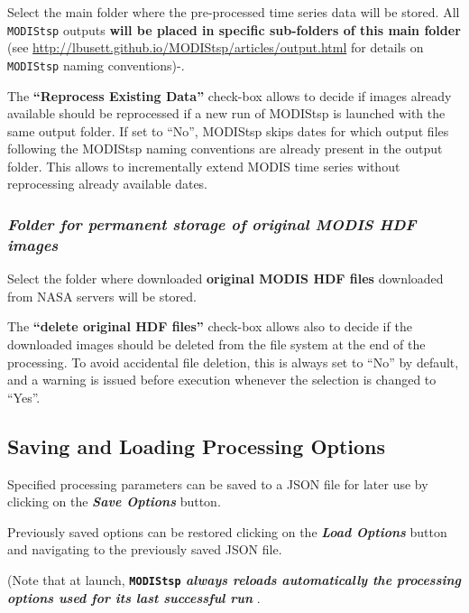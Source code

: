 \documentclass[]{article}
\begin{document}
Select the main folder where the pre-processed time series data will be
stored. All \texttt{MODIStsp} outputs \textbf{will be placed in specific
sub-folders of this main folder} (see
\url{http://lbusett.github.io/MODIStsp/articles/output.html} for details
on \texttt{MODIStsp} naming conventions)-.

The \textbf{``Reprocess Existing Data''} check-box allows to decide if
images already available should be reprocessed if a new run of MODIStsp
is launched with the same output folder. If set to ``No'', MODIStsp
skips dates for which output files following the MODIStsp naming
conventions are already present in the output folder. This allows to
incrementally extend MODIS time series without reprocessing already
available dates.

\subsubsection{\texorpdfstring{\emph{Folder for permanent storage of
original MODIS HDF
images}}{Folder for permanent storage of original MODIS HDF images}}\label{folder-for-permanent-storage-of-original-modis-hdf-images}

Select the folder where downloaded \textbf{original MODIS HDF files}
downloaded from NASA servers will be stored.

The \textbf{``delete original HDF files''} check-box allows also to
decide if the downloaded images should be deleted from the file system
at the end of the processing. To avoid accidental file deletion, this is
always set to ``No'' by default, and a warning is issued before
execution whenever the selection is changed to ``Yes''.

\subsection{\texorpdfstring{\textbf{Saving and Loading Processing
Options}}{Saving and Loading Processing Options}}\label{saving-and-loading-processing-options}

Specified processing parameters can be saved to a JSON file for later
use by clicking on the \emph{\textbf{Save Options}} button.

Previously saved options can be restored clicking on the
\emph{\textbf{Load Options}} button and navigating to the previously
saved JSON file.

 (Note that at launch, \textbf{\texttt{MODIStsp} \emph{always reloads
automatically the processing options used for its last successful run}}
.
\end{document}
